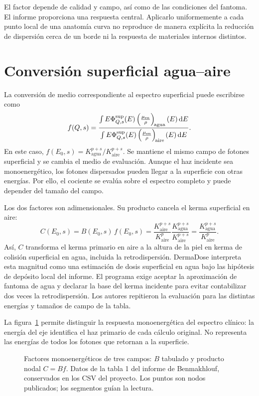 El factor depende de calidad y campo, así como de las condiciones del fantoma. El informe proporciona una respuesta central. Aplicarlo uniformemente a cada punto local de una anatomía curva no reproduce de manera explícita la reducción de dispersión cerca de un borde ni la respuesta de materiales internos distintos.

\section{Conversión superficial agua--aire}
La conversión de medio correspondiente al espectro superficial puede escribirse como
\begin{equation}\label{eq:ratio}
f(Q,s)=\frac{\int E\Phi^{\mathrm{sup}}_{Q,s}(E)\left(\frac{\mu_{\mathrm{en}}}{\rho}\right)_{\!\mathrm{agua}}(E)\,\mathrm dE}
{\int E\Phi^{\mathrm{sup}}_{Q,s}(E)\left(\frac{\mu_{\mathrm{en}}}{\rho}\right)_{\!\mathrm{aire}}(E)\,\mathrm dE}.
\end{equation}
En este caso, $f(E_0,s)=K_{\mathrm{agua}}^{p+s}/K_{\mathrm{aire}}^{p+s}$. Se mantiene el mismo campo de fotones superficial y se cambia el medio de evaluación. Aunque el haz incidente sea monoenergético, los fotones dispersados pueden llegar a la superficie con otras energías. Por ello, el cociente se evalúa sobre el espectro completo y puede depender del tamaño del campo.

Los dos factores son adimensionales. Su producto cancela el kerma superficial en aire:
\begin{equation}
C(E_0,s)=B(E_0,s)\,f(E_0,s)
=\frac{K_{\mathrm{aire}}^{p+s}}{K_{\mathrm{aire}}^{p}}
 \frac{K_{\mathrm{agua}}^{p+s}}{K_{\mathrm{aire}}^{p+s}}
=\frac{K_{\mathrm{agua}}^{p+s}}{K_{\mathrm{aire}}^{p}}.
\end{equation}
Así, $C$ transforma el kerma primario en aire a la altura de la piel en kerma de colisión superficial en agua, incluida la retrodispersión. DermaDose interpreta esta magnitud como una estimación de dosis superficial en agua bajo las hipótesis de depósito local del informe. El programa exige aceptar la aproximación de fantoma de agua y declarar la base del kerma incidente para evitar contabilizar dos veces la retrodispersión. Los autores repitieron la evaluación para las distintas energías y tamaños de campo de la tabla.


La figura~\ref{fig:monoenergeticos} permite distinguir la respuesta monoenergética del espectro clínico: la energía del eje identifica el haz primario de cada cálculo original. No representa las energías de todos los fotones que retornan a la superficie.
\begin{figure}[p]\centering
\caption{Factores monoenergéticos de tres campos: $B$ tabulado y producto nodal $C=Bf$. Datos de la tabla 1 del informe de Benmakhlouf, conservados en los CSV del proyecto. Los puntos son nodos publicados; los segmentos guían la lectura.}\label{fig:monoenergeticos}\end{figure}

